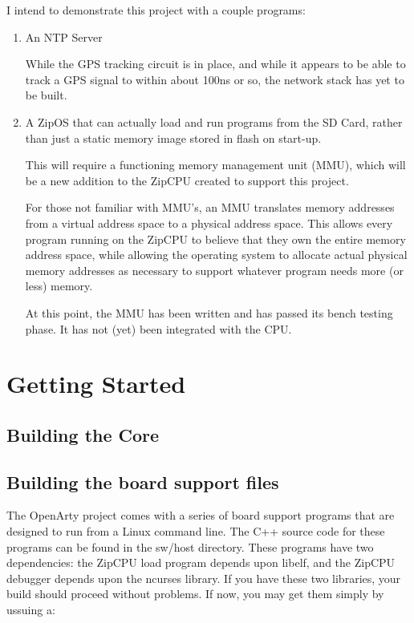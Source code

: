 \documentclass{gqtekspec}
\begin{document}
I intend to demonstrate this project with a couple programs:
\begin{enumerate}
\item An NTP Server

	While the GPS tracking circuit is in place, and while it appears to be
	able to track a GPS signal to within about 100ns or so, the 
	network stack has yet to be built.

\item A ZipOS that can actually load and run programs from the SD Card, rather
	than just a static memory image stored in flash on start-up.

	This will require a functioning memory management unit (MMU), which
	will be a new addition to the ZipCPU created to support this project.

	For those not familiar with MMU's, an MMU translates memory addresses
	from a virtual address space to a physical address space.  This allows
	every program running on the ZipCPU to believe that they own the entire
	memory address space, while allowing the operating system to allocate
	actual physical memory addresses as necessary to support whatever
	program needs more (or less) memory.

	At this point, the MMU has been written and has passed its bench
	testing phase.  It has not (yet) been integrated with the CPU.
\end{enumerate}


\chapter{Getting Started}\label{ch:getting-started}
\section{Building the Core}
%
\section{Building the board support files}
The OpenArty project comes with a series of board support programs that are
designed to run from a Linux command line.  The C++ source code for these
programs can be found in the sw/host directory.  These programs have two
dependencies: the ZipCPU load program depends upon libelf, and the ZipCPU
debugger depends upon the ncurses library.  If you have these two libraries,
your build should proceed without problems.  If now, you may get them simply
by ussuing a:
\begin{lstlisting}[language=bash]
% sudo apt-get install ncurses-dev libelf-dev texinfo
\end{lstlisting}
\end{document}
